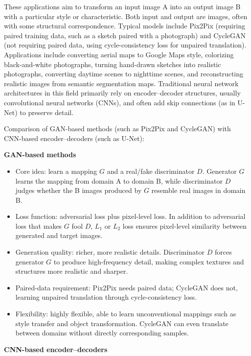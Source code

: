These applications aim to transform an input image A into an output image B with a particular style or characteristic. Both input and output are images, often with some structural correspondence. Typical models include Pix2Pix (requiring paired training data, such as a sketch paired with a photograph) and CycleGAN (not requiring paired data, using cycle-consistency loss for unpaired translation). Applications include converting aerial maps to Google Maps style, colorizing black-and-white photographs, turning hand-drawn sketches into realistic photographs, converting daytime scenes to nighttime scenes, and reconstructing realistic images from semantic segmentation maps. Traditional neural network architectures in this field primarily rely on encoder--decoder structures, usually convolutional neural networks (CNNs), and often add skip connections (as in U-Net) to preserve detail.

Comparison of GAN-based methods (such as Pix2Pix and CycleGAN) with CNN-based encoder--decoders (such as U-Net):

\textbf{GAN-based methods}

\begin{itemize}
\tightlist
\item
  Core idea: learn a mapping \(G\) and a real/fake discriminator \(D\). Generator \(G\) learns the mapping from domain A to domain B, while discriminator \(D\) judges whether the B images produced by \(G\) resemble real images in domain B.
\item
  Loss function: adversarial loss plus pixel-level loss. In addition to adversarial loss that makes \(G\) fool \(D\), \(L_1\) or \(L_2\) loss ensures pixel-level similarity between generated and target images.
\item
  Generation quality: richer, more realistic details. Discriminator \(D\) forces generator \(G\) to produce high-frequency detail, making complex textures and structures more realistic and sharper.
\item
  Paired-data requirement: Pix2Pix needs paired data; CycleGAN does not, learning unpaired translation through cycle-consistency loss.
\item
  Flexibility: highly flexible, able to learn unconventional mappings such as style transfer and object transformation. CycleGAN can even translate between domains without directly corresponding samples.
\end{itemize}

\textbf{CNN-based encoder--decoders}

